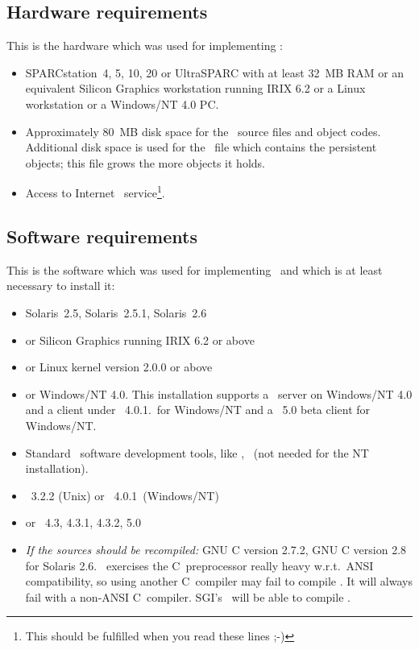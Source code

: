 \subsection{Hardware requirements}

This is the hardware which was used for implementing \plob:
\begin{itemize}

\item SPARCstation~4, 5, 10, 20 or UltraSPARC with at least 32~MB RAM
  or an equivalent Silicon Graphics workstation running IRIX 6.2 or
  a Linux workstation or a Windows/NT 4.0 PC.

\item Approximately 80~MB disk space for the \plob\ source files and
  object codes.  Additional disk space is used for the \postore\ file
  which contains the persistent objects; this file grows the more
  objects it holds.

\item Access to Internet \ service\footnote{This should be
    fulfilled when you read these lines ;-)}.

\end{itemize}

\subsection{Software requirements}

This is the software which was used for implementing \plob\ and which
is at least necessary to install it:

\begin{itemize}

\item Solaris~2.5, Solaris~2.5.1, Solaris~2.6

\item or Silicon Graphics running IRIX 6.2 or above

\item or Linux kernel version 2.0.0 or above

\item or Windows/NT 4.0. This installation supports a \plob\ server on
  Windows/NT 4.0 and a client under \lwcl\ 4.0.1.\ for
  Windows/NT and a \allegrocl\ 5.0 beta client for Windows/NT.

\item Standard \unix\ software development tools, like ,
  \ (not needed for the NT installation).

\item \lwcl\ 3.2.2 (Unix) or \lwcl\ 4.0.1\ (Windows/NT)

\item or \allegrocl\ 4.3, 4.3.1, 4.3.2, 5.0

\item \emph{If the sources should be recompiled:}
  GNU C version 2.7.2, GNU C version 2.8 for Solaris 2.6. \plob\ 
  exercises the C~preprocessor really heavy w.r.t.\ ANSI
  compatibility, so using another C~compiler may fail to compile
  \plob. It will always fail with a non-ANSI C~compiler. SGI's
  \ will be able to compile \plobwoexcl.

\end{itemize}

